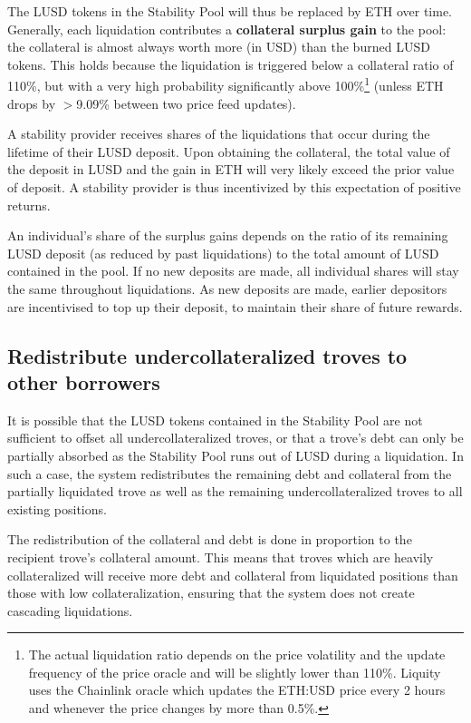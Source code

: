 \documentclass{article}
\begin{document}
The LUSD tokens in the Stability Pool will thus be replaced by ETH over time. Generally, each liquidation contributes a \textbf{collateral surplus gain} to the pool: the collateral is almost always worth more (in USD) than the burned LUSD tokens. This holds because the liquidation is triggered below a collateral ratio of 110\%, but with a very high probability significantly above 100\%\footnote{The actual liquidation ratio depends on the price volatility and the update frequency of the price oracle and will be slightly lower than 110\%. Liquity uses the Chainlink oracle which updates the ETH:USD price every 2 hours and whenever the price changes by more than 0.5\%.} (unless ETH drops by $>$9.09\% between two price feed updates).

A stability provider receives shares of the liquidations that occur during the lifetime of their LUSD deposit. Upon obtaining the collateral, the total value of the deposit in LUSD and the gain in ETH will very likely exceed the prior value of deposit. A stability provider is thus incentivized by this expectation of positive returns.

An individual’s share of the surplus gains depends on the ratio of its remaining LUSD deposit (as reduced by past liquidations) to the total amount of LUSD contained in the pool. If no new deposits are made, all individual shares will stay the same throughout liquidations. As new deposits are made, earlier depositors are incentivised to top up their deposit, to maintain their share of future rewards.

\subsection{Redistribute undercollateralized troves to other borrowers}
It is possible that the LUSD tokens contained in the Stability Pool are not sufficient to offset all undercollateralized troves, or that a trove’s debt can only be partially absorbed as the Stability Pool runs out of LUSD during a liquidation. In such a case, the system redistributes the remaining debt and collateral from the partially liquidated trove as well as the remaining undercollateralized troves to all existing positions.

The redistribution of the collateral and debt is done in proportion to the recipient trove’s collateral amount. This means that troves which are heavily collateralized will receive more debt and collateral from liquidated positions than those with low collateralization, ensuring that the system does not create cascading liquidations.\\
\end{document}
